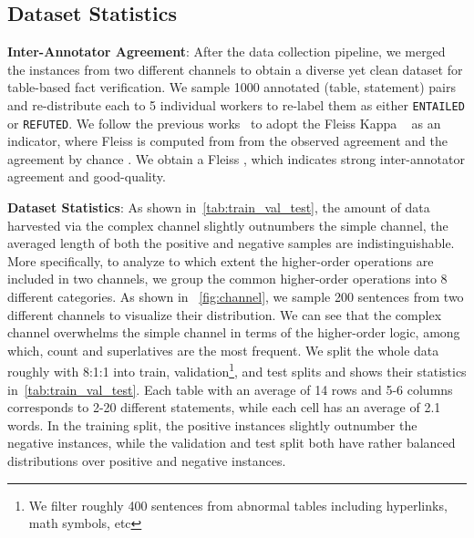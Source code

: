 \documentclass{article} \usepackage{iclr2020_conference,times}
\begin{document}
\subsection{Dataset Statistics}
\textbf{Inter-Annotator Agreement}: 
After the data collection pipeline, we merged the instances from two different channels to obtain a diverse yet clean dataset for table-based fact verification. We sample 1000 annotated (table, statement) pairs and re-distribute each to 5 individual workers to re-label them as either {\tt ENTAILED} or {\tt REFUTED}. We follow the previous works~\citep{thorne2018fever,bowman2015large} to adopt the Fleiss Kappa ~\citep{fleiss1971measuring} as an indicator, where Fleiss  is computed from from the observed agreement  and the agreement by chance . We obtain a Fleiss , which indicates strong inter-annotator agreement and good-quality. 

\noindent \textbf{Dataset Statistics}: As shown in~\autoref{tab:train_val_test}, the amount of data harvested via the complex channel slightly outnumbers the simple channel, the averaged length of both the positive and negative samples are indistinguishable. More specifically, to analyze to which extent the higher-order operations are included in two channels, we group the common higher-order operations into 8 different categories. As shown in ~\autoref{fig:channel}, we sample 200 sentences from two different channels to visualize their distribution. We can see that the complex channel overwhelms the simple channel in terms of the higher-order logic, among which, count and superlatives are the most frequent. We split the whole data roughly with 8:1:1 into train, validation\footnote{We filter roughly 400 sentences from abnormal tables including hyperlinks, math symbols, etc}, and test splits and shows their statistics in~\autoref{tab:train_val_test}. Each table with an average of 14 rows and 5-6 columns corresponds to 2-20 different statements, while each cell has an average of 2.1 words. In the training split, the positive instances slightly outnumber the negative instances, while the validation and test split both have rather balanced distributions over positive and negative instances. 
\end{document}
